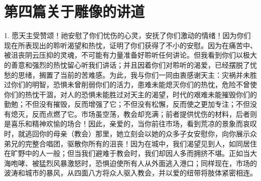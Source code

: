 

\section{第四篇关于雕像的讲道}

\par

1. 愿天主受赞颂！祂安慰了你们忧伤的心灵，安抚了你们激动的情绪！因为你们现在所表现出的聆听渴望和热忱，证明了你们获得了不小的安慰。因为在痛苦中、被沮丧阴云压抑的灵魂，不可能有力量准备好聆听任何讲论。但我看到你们以极大的善意和强烈的热忱留心听我们讲话；并且因着你们对聆听的渴爱，已经摆脱了忧愁的思绪，搁置了当前的苦难感。为此，我与你们一同由衷感谢天主：灾祸并未胜过你们的明智，恐惧未曾削弱你们的活力，患难未能熄灭你们的热忱，危险不曾使你们的热忱干涸，对人的恐惧未能胜过对天主的渴望，时代的艰难未能摧毁你们的勤勉；不但没有摧毁，反而增强了它；不但没有松懈，反而使之更加专注；不但没有熄灭，反而点燃了它。市场虽空荡，教会却充满；前者提供忧伤的材料，后者则是喜乐和精神欢愉的场合！因此，亲爱的，当你前往市场，看到荒凉的景象而哀叹时，就逃回你的母亲（教会）那里，她立刻会以她的众多子女安慰你，向你展示众弟兄的完整合唱团，驱散你所有的沮丧！因为在城中，我们渴望见到人，如同居住在旷野中的人一般；但当我们避难于教会时，我们却因人多而拥挤不堪。正如当大海咆哮、被猛烈风暴激怒时，恐惧迫使所有人从外面逃入港口；同样现在，市场的波涛和城市的暴风，从四面八方将众人驱入教会，并以爱的纽带将肢体紧密相连。\par

